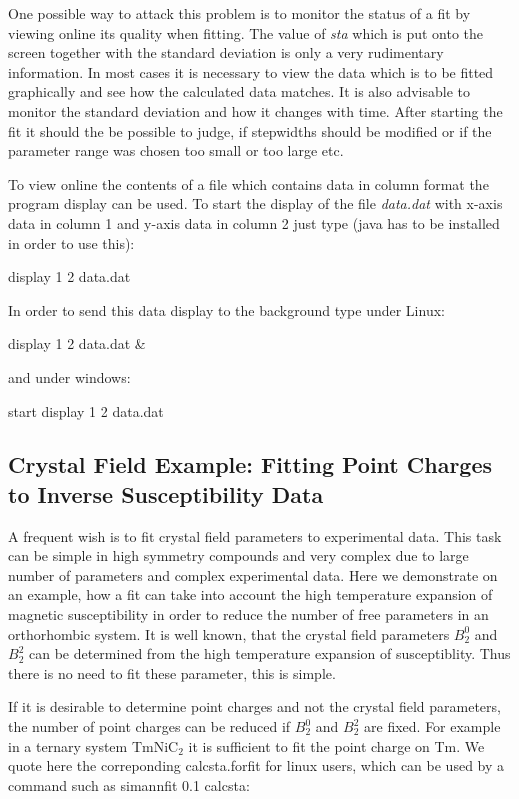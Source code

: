 One possible way to attack this problem is to monitor the status of a fit
by viewing online its quality when fitting. The value of {\em sta} which is put onto
the screen together with the standard deviation is only a very rudimentary information.
In most cases it is necessary to view the data which is to be fitted graphically and
see how the calculated data matches. It is also advisable to monitor the
standard deviation and how it changes with time. After starting the
fit it should the be possible to judge, if stepwidths should be modified or if
the parameter range was chosen too small or too large etc.

To view online the contents of a file which contains data in column format
the program {\prg display} can be used. To start the display of
the file {\em data.dat} with x-axis data in column 1 and y-axis data
in column 2 just type (java has to be installed in order to use this):

display 1 2 data.dat

In order to send this data display to the background type under Linux:

display 1 2 data.dat \&

and under windows:

start display 1 2 data.dat

\subsection{Crystal Field  Example: Fitting Point Charges to Inverse Susceptibility Data}

A frequent wish is to fit crystal field parameters to experimental data. This task can
be simple in high symmetry compounds and  very complex due to large number of parameters
and complex experimental data. Here we demonstrate on an example, how a fit can take into account
the high temperature expansion of magnetic susceptibility in order to reduce the
number of free parameters in an orthorhombic system. It is well known, that the 
crystal field parameters $B_2^0$ and $B_2^2$ can be determined from the high
 temperature expansion of susceptiblity. Thus there is no need to fit these parameter, this
is simple. 

If it is desirable to determine point charges and not the crystal field parameters, the
number of point charges can be reduced if $B_2^0$ and $B_2^2$ are fixed. For example
in a ternary system TmNiC$_2$ it is sufficient to fit the point charge on Tm. We quote here
the correponding {\prg calcsta.forfit}  for linux users, which can be used by a command
such as {\prg simannfit 0.1 calcsta}:

